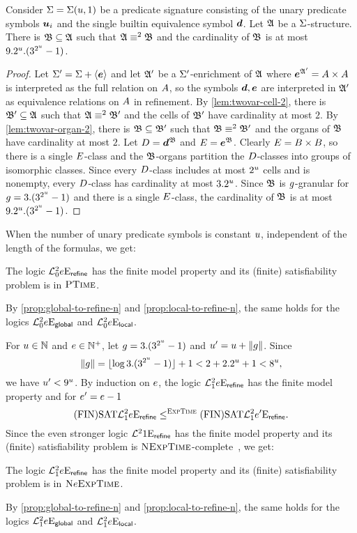 \begin{remark}
Consider $\mathrm{\Sigma} = \mathrm{\Sigma}(u,1)$ be a predicate signature consisting of the unary
predicate symbols $\bm{u}_{i}$ and the single builtin equivalence symbol $\bm{d}$. 
Let $\mathfrak{A}$ be a $\mathrm{\Sigma}$-structure.
There is $\mathfrak{B} \subseteq \mathfrak{A}$ such that $\mathfrak{A} \equiv^{2} \mathfrak{B}$ and the
cardinality of $\mathfrak{B}$ is at most $9.2^u.(3^{2^u}-1)$.
\end{remark}
\begin{proof}
Let $\mathrm{\Sigma'} = \mathrm{\Sigma} + \left\langle \bm{e} \right\rangle$ and let $\mathfrak{A'}$ be a $\mathrm{\Sigma'}$-enrichment of
$\mathfrak{A}$ where $\bm{e}^{\mathfrak{A'}} = {A\times A}$ is interpreted as the full relation on
$A$, so the symbols $\bm{d}, \bm{e}$ are interpreted in $\mathfrak{A'}$ as equivalence
relations on $A$ in refinement.
By \cref{lem:twovar-cell-2}, there is $\mathfrak{B'} \subseteq \mathfrak{A}$ such that
$\mathfrak{A} \equiv^{2} \mathfrak{B'}$ and the cells of $\mathfrak{B'}$ have cardinality at most $2$.
By \cref{lem:twovar-organ-2}, there is $\mathfrak{B} \subseteq \mathfrak{B'}$ such that
$\mathfrak{B} \equiv^{2} \mathfrak{B'}$ and the organs of $\mathfrak{B}$ have cardinality at most $2$.
Let $D = \bm{d}^{\mathfrak{B}}$ and $E = \bm{e}^{\mathfrak{B}}$.
Clearly $E = {B\times B}$, so there is a single $E$-class and the
$\mathfrak{B}$-organs partition the $D$-classes into groups of isomorphic classes.
Since every $D$-class includes at most $2^u$ cells and is nonempty, every
$D$-class has cardinality at most $3.2^u$.
Since $\mathfrak{B}$ is $g$-granular for $g = 3.(3^{2^u}-1)$ and there is a
single $E$-class, the cardinality of $\mathfrak{B}$ is at most
$9.2^u.(3^{2^u}-1)$.
\end{proof}

When the number of unary predicate symbols is constant $u$, independent of
the length of the formulas, we get:
\begin{proposition}
The logic $\mathcal{L}^{2}_{0}{e}\mathrm{E}_{\mathsf{refine}}$ has the finite model
property and its (finite) satisfiability problem is in $\text{\normalfont{\scshape PTime}}$.

By \cref{prop:global-to-refine-n} and \cref{prop:local-to-refine-n},
the same holds for the logics
$\mathcal{L}^{2}_{0}{e}\mathrm{E}_{\mathsf{global}}$ and 
$\mathcal{L}^{2}_{0}{e}\mathrm{E}_{\mathsf{local}}$.
\end{proposition}

For $u \in \mathbb{N}$ and $e \in \mathbb{N}^{+}$, let $g = 3.(3^{2^u}-1)$
and ${u'} = u + \|g\|$.
Since
\[
  \|g\| = \lfloor \log{3.(3^{2^u}-1)} \rfloor + 1 <
   2 + 2.2^u+1 <
   8^u,
\]
we have ${u'} < 9^u$.
By induction on $e$, the logic $\mathcal{L}^{2}_{1}{e}\mathrm{E}_{\mathsf{refine}}$ has the
finite model property and for ${e'} = e-1$
\[
\mathrm{(FIN)SAT}\mathcal{L}^{2}_{1}{e}\mathrm{E}_{\mathsf{refine}} \leq^{\text{\normalfont{\scshape ExpTime}}}
\mathrm{(FIN)SAT}\mathcal{L}^{2}_{1}{{e'}}\mathrm{E}_{\mathsf{refine}}.
\]
Since the even stronger logic $\mathcal{L}^{2}_{{}}{1}\mathrm{E}_{\mathsf{refine}}$ has the
finite model property and its (finite) satisfiability problem is
$\text{\normalfont{\scshape NExpTime}}$-complete~\cite{kieronski2005small}, we get:
\begin{proposition}
The logic $\mathcal{L}^{2}_{1}{e}\mathrm{E}_{\mathsf{refine}}$ has the finite model property and
its (finite) satisfiability problem is in $\text{\normalfont{\scshape N}}e\text{\normalfont{\scshape ExpTime}}$.

By \cref{prop:global-to-refine-n} and \cref{prop:local-to-refine-n},
the same holds for the logics
$\mathcal{L}^{2}_{1}{e}\mathrm{E}_{\mathsf{global}}$ and $\mathcal{L}^{2}_{1}{e}\mathrm{E}_{\mathsf{local}}$.
\end{proposition}

